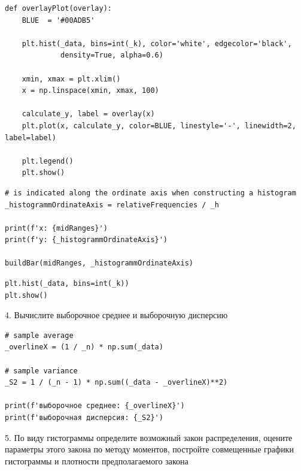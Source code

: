 \documentclass[a4paper, 14pt]{extarticle}
\begin{document}
\begin{lstlisting}
def overlayPlot(overlay):
    BLUE  = '#00ADB5'

    plt.hist(_data, bins=int(_k), color='white', edgecolor='black', 
             density=True, alpha=0.6)

    xmin, xmax = plt.xlim()
    x = np.linspace(xmin, xmax, 100)
    
    calculate_y, label = overlay(x)
    plt.plot(x, calculate_y, color=BLUE, linestyle='-', linewidth=2, label=label)

    plt.legend()
    plt.show()
\end{lstlisting}

\begin{lstlisting}
# is indicated along the ordinate axis when constructing a histogram
_histogrammOrdinateAxis = relativeFrequencies / _h

print(f'x: {midRanges}')
print(f'y: {_histogrammOrdinateAxis}')

buildBar(midRanges, _histogrammOrdinateAxis)
\end{lstlisting}

\begin{lstlisting}
plt.hist(_data, bins=int(_k))
plt.show()
\end{lstlisting}

\begin{center}
    4. Вычислите выборочное среднее и выборочную дисперсию
\end{center}

\begin{lstlisting}[caption={поиск выборочного среднего и выборочной дисперсии}, label={lst:10}]
# sample average
_overlineX = (1 / _n) * np.sum(_data) 

# sample variance
_S2 = 1 / (_n - 1) * np.sum((_data - _overlineX)**2)

print(f'выборочное среднее: {_overlineX}')
print(f'выборочная дисперсия: {_S2}')
\end{lstlisting}

\begin{center}
    5. По виду гистограммы определите возможный закон распределения, 
    оцените параметры этого закона по методу моментов, постройте совмещенные 
    графики гистограммы и плотности предполагаемого закона
\end{center}
\end{document}
